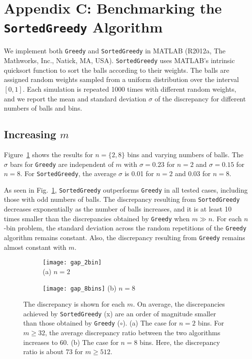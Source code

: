 \documentclass[12pt,psfig,a4]{article}
\newcommand{\sg}{\texttt{SortedGreedy}}
\newcommand{\gr}{\texttt{Greedy}}
\theoremstyle{plain}
\begin{document}
\section{Appendix C: Benchmarking the \sg{} Algorithm}

We implement both \gr{} and \sg{} in MATLAB (R2012a, The Mathworks, Inc., Natick, MA, USA). \sg{} uses MATLAB's intrinsic quicksort function to sort the balls according to their weights. The balls are assigned random weights sampled from a uniform distribution over the interval $[0,1]$. Each simulation is repeated 1000 times with different random weights, and we report the mean and standard deviation $\sigma$ of the discrepancy for different numbers of balls and bins. 

\subsection{Increasing $m$}

Figure~\ref{fig:gaps} shows the results for $n=\{2,8\}$ bins and varying numbers of balls. The $\sigma$ bars for \gr{} are independent of $m$ with $\sigma=0.23$ for $n=2$ and $\sigma=0.15$ for $n=8$. For \sg{}, the average $\sigma$ is 0.01 for $n=2$ and 0.03 for $n=8$. 

As seen in Fig.~\ref{fig:gaps}, \sg{} outperforms \gr{} in all tested cases, including those with odd numbers of balls. The discrepancy resulting from \sg{} decreases exponentially as the number of balls increases, and it is at least 10 times smaller than the discrepancies obtained by \gr{} when $m\gg n$. For each $n$-bin problem, the standard deviation across the random repetitions of the \gr{} algorithm remains constant. Also, the discrepancy resulting from \gr{} remains almost constant with $m$. 

\begin{figure}
\centering
	\begin{subfigure}[b]{0.49\textwidth}	
	      	\texttt{[image: gap\_2bin]} \\
		\centering (a) $n=2$
	\end{subfigure} 
	\begin{subfigure}[b]{0.49\textwidth}	
	      	\texttt{[image: gap\_8bins]} 
		\centering (b) $n=8$
	\end{subfigure} 
	\caption{The discrepancy is shown for each $m$.  On average, the discrepancies achieved by \sg{} (x) are an order of magnitude smaller than those obtained by \gr{} ($\circ$). (a) The case for $n=2$ bins. For $m\geq32$, the average discrepancy ratio between the two algorithms increases to 60. (b) The case for $n=8$ bins. Here, the discrepancy ratio is about 73 for $m\ge 512$.}
	\label{fig:gaps}
\end{figure}
\end{document}
